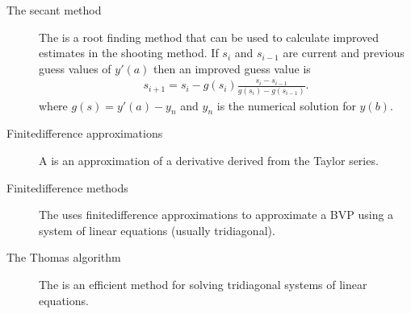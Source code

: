 \documentclass[letterpaper,10pt,english]{jupyterBook}
\begin{document}
\begin{description}
\item[{The secant method\label{\detokenize{8_Appendices/8.0_Cheat_sheet:term-The-secant-method}}}] \leavevmode
\sphinxAtStartPar
The {\hyperref[\detokenize{5_BVPs/5.1_Shooting_method:secant-method-section}]{}} is a root finding method that can be used to calculate improved estimates in the shooting method. If \(s_{i}\) and \(s_{i-1}\) are current and previous guess values of \(y'(a)\) then an improved guess value is
\begin{align*}
    s_{i+1} = s_i - g(s_i)\frac{s_i - s_{i-1}}{g(s_i) - g(s_{i-1})}.
\end{align*}
\sphinxAtStartPar
where \(g(s) = y'(a) - y_n\) and \(y_n\) is the numerical solution for \(y(b)\).

\item[{Finite\sphinxhyphen{}difference approximations\label{\detokenize{8_Appendices/8.0_Cheat_sheet:term-Finite-difference-approximations}}}] \leavevmode
\sphinxAtStartPar
A {\hyperref[\detokenize{5_BVPs/5.2_Finite_difference_method:finite-difference-method-section}]{}} is an approximation of a derivative derived from the Taylor series.

\item[{Finite\sphinxhyphen{}difference methods\label{\detokenize{8_Appendices/8.0_Cheat_sheet:term-Finite-difference-methods}}}] \leavevmode
\sphinxAtStartPar
The {\hyperref[\detokenize{5_BVPs/5.2_Finite_difference_method:finite-difference-method-section}]{}} uses finite\sphinxhyphen{}difference approximations to approximate a BVP using a system of linear equations (usually tridiagonal).

\item[{The Thomas algorithm\label{\detokenize{8_Appendices/8.0_Cheat_sheet:term-The-Thomas-algorithm}}}] \leavevmode
\sphinxAtStartPar
The {\hyperref[\detokenize{5_BVPs/5.2_Finite_difference_method:thomas-algorithm-section}]{}} is an efficient method for solving tridiagonal systems of linear equations.

\end{description}
\end{document}
